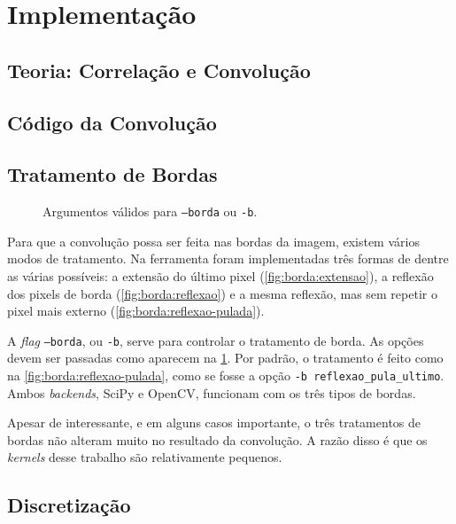 \section{Implementação} \label{sec:impl}

\subsection{Teoria: Correlação e Convolução}

    

\subsection{Código da Convolução}

    

\subsection{Tratamento de Bordas}

    \begin{figure}[H]
        \centering
        

        \caption{Argumentos válidos para \texttt{--borda} ou \texttt{-b}.}
        \label{fig:borda}
    \end{figure}

    Para que a convolução possa ser feita nas bordas da imagem, existem vários modos de tratamento. Na ferramenta foram implementadas três formas de dentre as várias possíveis: a extensão do último pixel (\ref{fig:borda:extensao}), a reflexão dos pixels de borda (\ref{fig:borda:reflexao}) e a mesma reflexão, mas sem repetir o pixel mais externo (\ref{fig:borda:reflexao-pulada}).

    A \textit{flag} \texttt{--borda}, ou \texttt{-b}, serve para controlar o tratamento de borda. As opções devem ser passadas como aparecem na \cref{fig:borda}. Por padrão, o tratamento é feito como na \cref{fig:borda:reflexao-pulada}, como se fosse a opção \texttt{-b reflexao_pula_ultimo}. Ambos \textit{backends}, SciPy e OpenCV, funcionam com os três tipos de bordas.

    Apesar de interessante, e em alguns casos importante, o três tratamentos de bordas não alteram muito no resultado da convolução. A razão disso é que os \textit{kernels} desse trabalho são relativamente pequenos.

\subsection{Discretização} \label{sec:impl:t}

